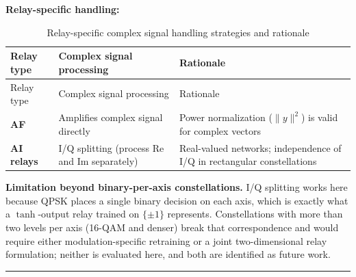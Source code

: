 \textbf{Relay-specific handling:}

\begin{longtable}[]{@{}
  >{\raggedright\arraybackslash}p{}
  >{\raggedright\arraybackslash}p{}
  >{\raggedright\arraybackslash}p{}@{}}
\caption[Relay-specific complex-signal handling]{Relay-specific complex signal handling strategies and rationale}\label{tbl:table31}\tabularnewline
\toprule\noalign{}
\begin{minipage}[b]{\linewidth}\raggedright
Relay type
\end{minipage} & \begin{minipage}[b]{\linewidth}\raggedright
Complex signal processing
\end{minipage} & \begin{minipage}[b]{\linewidth}\raggedright
Rationale
\end{minipage} \\
\midrule\noalign{}
\endfirsthead
\toprule\noalign{}
\begin{minipage}[b]{\linewidth}\raggedright
Relay type
\end{minipage} & \begin{minipage}[b]{\linewidth}\raggedright
Complex signal processing
\end{minipage} & \begin{minipage}[b]{\linewidth}\raggedright
Rationale
\end{minipage} \\
\midrule\noalign{}
\endhead
\bottomrule\noalign{}
\endlastfoot
\textbf{AF} & Amplifies complex signal directly & Power normalization (\(\|y\|^2\)) is valid for complex vectors \\
\textbf{AI relays} & I/Q splitting (process Re and Im separately) & Real-valued networks; independence of I/Q in rectangular constellations \\
\end{longtable}

\textbf{Limitation beyond binary-per-axis constellations.} I/Q splitting works here because QPSK places a single binary decision on each axis, which is exactly what a \(\tanh\)-output relay trained on \(\{\pm 1\}\) represents. Constellations with more than two levels per axis (16-QAM and denser) break that correspondence and would require either modulation-specific retraining or a joint two-dimensional relay formulation; neither is evaluated here, and both are identified as future work.

\begin{center}\rule{0.5\linewidth}{0.5pt}\end{center}
